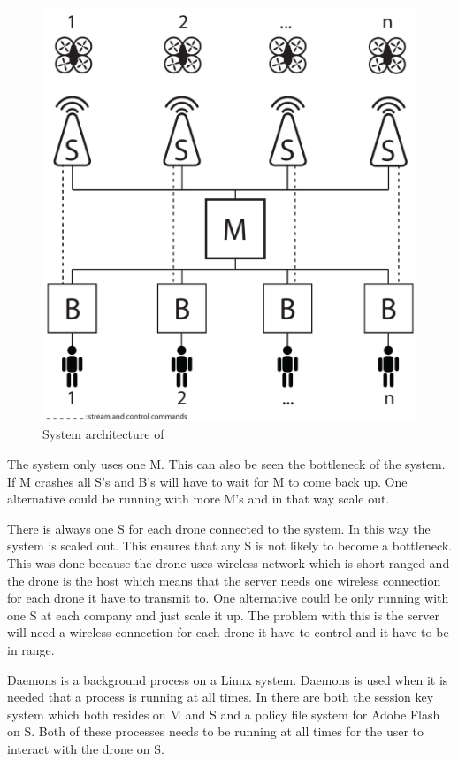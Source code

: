 \begin{figure}[htb]
    \centering 
    \includegraphics[width=\textwidth]{gfx/system_architecture.pdf}
    \caption{System architecture of \projectname{}}
    \label{fig:system_architecture}
\end{figure}

The system only uses one M. This can also be seen the bottleneck of the system. If M crashes all S's and B's will have to wait for M to come back up.
One alternative could be running with more M's and in that way scale out.

There is always one S for each drone connected to the system. In this way the system is scaled out. This ensures that any S is not likely to become a bottleneck.
This was done because the drone uses wireless network which is short ranged and the drone is the host which means that the server needs one wireless connection for each drone it have to transmit to.
One alternative could be only running with one S at each company and just scale it up. The problem with this is the server will need a wireless connection for each drone it have to control and it have to be in range.

Daemons is a background process on a Linux system.
Daemons is used when it is needed that a process is running at all times. In \projectname{} there are both the session key system which both resides on M and S and a policy file system for Adobe Flash on S. Both of these processes needs to be running at all times for the user to interact with the drone on S.